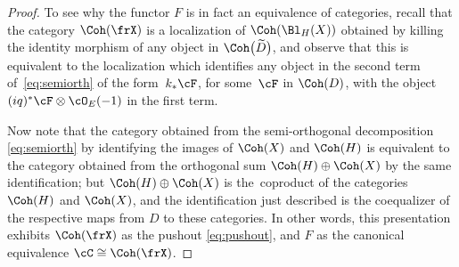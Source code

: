 \begin{proof}
To see why the functor $F$ is in fact an equivalence of categories, recall that the
category $\Coh(\frX)$ is a localization of $\Coh(\Bl_H(X))$ obtained by killing the identity morphism of any object in $\Coh\big(\widetilde{D}\big)$, and observe that this is equivalent to the localization which identifies any object in the second term of~\eqref{eq:semiorth} of the form~$k_*\cF$, for some~$\cF$ in $\Coh(D)$, with the object $(iq)^*\cF\otimes \cO_E(-1)$ in the first term.

Now note that the
category obtained from the semi-orthogonal decomposition \eqref{eq:semiorth} by identifying the images of $\Coh(X)$ and $\Coh(H)$ is equivalent to the category obtained from the ortho\-go\-nal sum $\Coh(H)\oplus \Coh(X)$ by the same identification;
but $\Coh(H)\oplus \Coh(X)$ is the~co\-pro\-duct of the categories $\Coh(H)$ and $\Coh(X)$, and the identification just described is the coequalizer of the respective maps from $D$ to these categories. In other words, this presentation exhibits $\Coh(\frX)$ as the pushout \eqref{eq:pushout}, and $F$ as the canonical equivalence $\cC\cong \Coh(\frX)$.
\end{proof}
